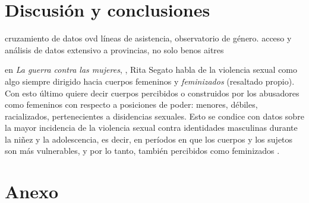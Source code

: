 \documentclass[10 pt]{article}
\begin{document}
\section*{Discusión y conclusiones}\label{conc}
cruzamiento de datos ovd líneas de asistencia, observatorio de género.
acceso y análisis de datos extensivo a provincias, no solo benos aitres


en \textit{La guerra contra las mujeres}, \citeyearpar{segato2016guerra}, Rita Segato habla de la violencia sexual como algo siempre dirigido hacia cuerpos femeninos y \textit{feminizados} (resaltado propio). Con esto último quiere decir cuerpos percibidos o construidos por los abusadores como femeninos con respecto a posiciones de poder: menores, débiles, racializados, pertenecientes a disidencias sexuales. Esto se condice con datos sobre la mayor incidencia de la violencia sexual contra identidades masculinas durante la niñez y la adolescencia, es decir, en períodos en que los cuerpos y los sujetos son más vulnerables, y por lo tanto, también percibidos como feminizados \citep*{contreras2016violencia,ufem_relevamiento,ferris2002world}.

\newpage




\newpage
\section*{Anexo}\label{anex}
\end{document}
